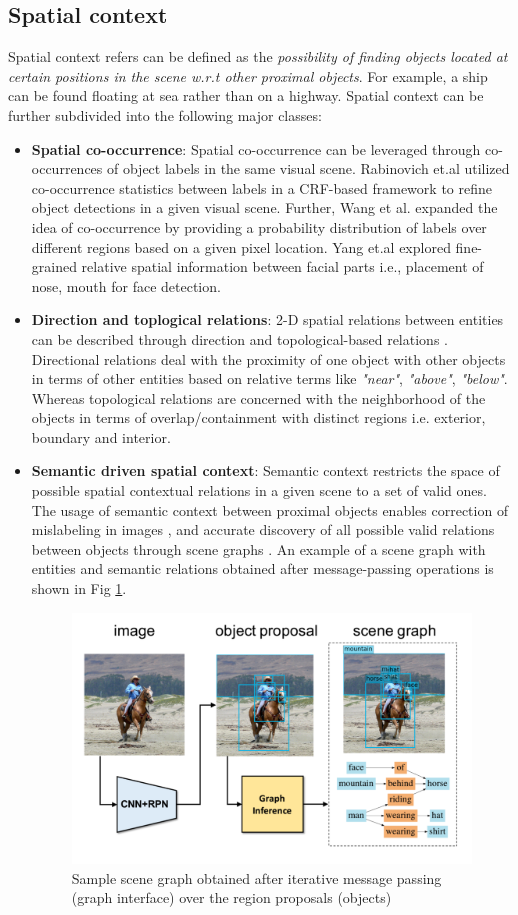 \subsection{Spatial context}
Spatial context refers can be defined as the \textit{possibility of finding objects located at certain positions in the scene w.r.t other proximal objects}. For example, a ship can be found floating at sea rather than on a highway.
Spatial context can be further subdivided into the following major classes:
\begin{itemize}
    \item  \textbf{Spatial co-occurrence}: Spatial co-occurrence can be leveraged through co-occurrences of object labels in the same visual scene. Rabinovich et.al \cite{Rabinovich2007ObjectsIC} utilized co-occurrence statistics between labels in a CRF-based framework to refine object detections in a given visual scene. Further, Wang et al. \cite{Wang2007ShapeAA} expanded the idea of co-occurrence by providing a probability distribution of labels over different regions based on a given pixel location. Yang et.al \cite{Faceness-Net} explored fine-grained relative spatial information between facial parts i.e., placement of nose, mouth for face detection. 
    \item  \textbf{Direction and toplogical relations}: 2-D spatial relations between entities can be described through direction and topological-based relations \cite{Marques2010ContextMI}. Directional relations deal with the proximity of one object with other objects in terms of other entities based on relative terms like \textit{"near"}, \textit{"above"}, \textit{"below"}. Whereas topological relations are concerned with the neighborhood of the objects in terms of overlap/containment with distinct regions i.e. exterior, boundary and interior.
    \item  \textbf{Semantic driven spatial context}: Semantic context restricts the space of possible spatial contextual relations in a given scene to a set of valid ones. The usage of semantic context between proximal objects enables correction of mislabeling in images \cite{Rabinovich2007ObjectsIC}, and accurate discovery of all possible valid relations between objects through scene graphs \cite{Chang2021ACS}. An example of a scene graph with entities and semantic relations obtained after message-passing operations \cite{Xu2017SceneGG} is shown in Fig \ref{scenegraph}.
    \begin{figure}[h!]
    \centering
        \includegraphics[width=0.5\linewidth]{figures/Scene_graph_outline.png}
        \caption{Sample scene graph obtained after iterative message passing (graph interface) over the region proposals (objects) }
        \label{scenegraph}
    \end{figure}
\end{itemize}

